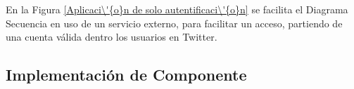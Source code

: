 \begin{minipage}{1.0\textwidth}
	\centering
	\label{Aplicaciones de servidor web}
\end{minipage}

En la Figura \ref{Aplicaci\'{o}n de solo autentificaci\'{o}n} se facilita el 
Diagrama Secuencia en uso de un servicio externo, para facilitar un acceso,
partiendo de una cuenta v\'{a}lida dentro los usuarios en Twitter.

\begin{minipage}{1.0\textwidth}
	\centering
	\label{Aplicaci\'{o}n de solo autentificaci\'{o}n}
\end{minipage}
	
\subsection{Implementaci\'{o}n de Componente}


